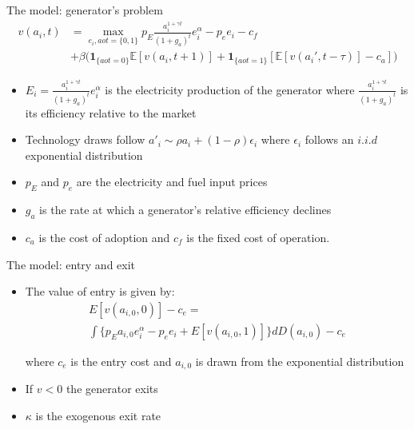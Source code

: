 \documentclass{beamer}
\begin{document}
\begin{frame}{The model: generator's problem}
\begin{align*} 
    v(a_{i},t) &= \max_{e_i,aot=\{0,1\}} p_E\frac{a_{i}^{1+\gamma t}}{(1+g_a)^t} e_i^\alpha -p_e e_i-c_f\\ 
    &+\beta \big(\mathbf{1}_{\{aot =0\}} \mathbb{E}[v(a_{i},t+1)] + \mathbf{1}_{\{aot =1\}}[ \mathbb{E}[v(a_{i}',t-\tau)]-c_a]\big)
\end{align*}
\begin{itemize}
 \item $E_i =\frac{a_{i}^{1+\gamma t}}{(1+g_a)^t} e_i^\alpha$ is the electricity production of the generator where $\frac{a_{i}^{1+\gamma t}}{(1+g_a)^t}$ is its efficiency relative to the market\\
    \item Technology draws follow $a'_i\sim \rho a_i + (1-\rho)\epsilon_i$ where $\epsilon_i$ follows an $i.i.d$ exponential distribution
    \item $p_E$ and $p_e$ are the electricity and fuel input prices
    \item $g_a$ is the rate at which a generator's relative efficiency declines
    \item $c_a$ is the cost of adoption and  $c_f$ is the fixed cost of operation.
\end{itemize}
    
\end{frame}
\begin{frame}{The model: entry and exit}
\begin{itemize}
    \item The value of entry is given by: 
    \begin{equation*}
    \begin{aligned} 
    E[v(a_{i,0},0)]-c_{e}=\\\int \big\{ p_Ea_{i,0} e_i^\alpha -p_e e_i+E[v(a_{i,0},1)] \big\} dD(a_{i,0})-c_{e}
\end{aligned}
    \end{equation*}
    
where $c_{e}$ is the entry cost and $a_{i,0}$ is drawn from the exponential distribution
\hfill \break
    \item If $v<0$ the generator exits\\
    \item $\kappa$ is the exogenous exit rate
\end{itemize}
    
\end{frame}
\end{document}
